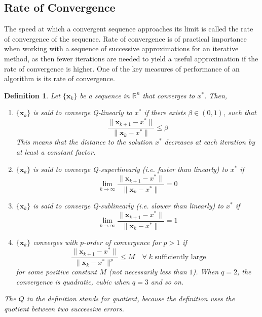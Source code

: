 \documentclass[12pt]{report}
\newtheorem{defn}{Definition}[section]
\numberwithin{equation}{section}
\begin{document}
\subsection{Rate of Convergence}
The speed at which a convergent sequence approaches its limit is called the rate of convergence of the sequence. Rate of convergence is of practical importance when working with a sequence of successive approximations for an iterative method, as then fewer iterations are needed to yield a useful approximation if the rate of convergence is higher. One of the key measures of performance of an algorithm is its rate of convergence. 
\begin{defn}
\normalfont
Let $\{\bm{x}_k\}$ be a sequence in $\mathbb{R}^n$ that converges to $x^*$. Then,
\begin{enumerate}[label=\roman*)]
\item $\{\bm{x}_k\}$ is said to converge \textit{Q-linearly} to $x^*$ if there exists $\beta \in (0,1)$, such that 
\[
\frac{\|\bm{x}_{k+1}-x^*\|}{\|\bm{x}_{k}-x^*\|} \leq \beta 
\]
This means that the distance to the solution $x^*$ decreases at each iteration by at least a constant factor.
\item $\{\bm{x}_k\}$ is said to converge \textit{Q-superlinearly} (i.e. faster than linearly) to $x^*$ if  
\[
\lim_{k\rightarrow\infty} \frac{\|\bm{x}_{k+1}-x^*\|}{\|\bm{x}_{k}-x^*\|} = 0
\]
\item $\{\bm{x}_k\}$ is said to converge \textit{Q-sublinearly} (i.e. slower than linearly) to $x^*$ if  
\[
\lim_{k\rightarrow\infty} \frac{\|\bm{x}_{k+1}-x^*\|}{\|\bm{x}_{k}-x^*\|} = 1
\]
\item $\{\bm{x}_k\}$ converges with $p$-order of convergence  for $p>1$ if  
\[
\ \frac{\|\bm{x}_{k+1}-x^*\|}{\|\bm{x}_{k}-x^*\|^p} \leq M \quad \forall \; k \text{ sufficiently large}
\]
for some positive constant $M$ (not necessarily less than $1$). When $q=2$, the convergence is quadratic, cubic when $q=3$ and so on. 
\end{enumerate}
The $Q$ in the definition stands for quotient, because the definition uses the quotient between two successive errors. 
\end{defn}
\end{document}
